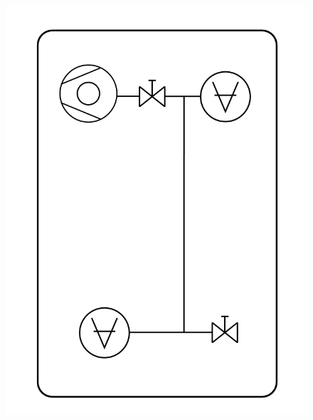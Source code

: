 \documentclass[a4paper,11pt]{article}
\begin{document}
	
\begin{center} 
\begin{figure}[htpd]
\hspace{120pt}
\includegraphics[scale=0.4]{schema_finale.png}
\end{figure}
\end{center}
\end{document}
